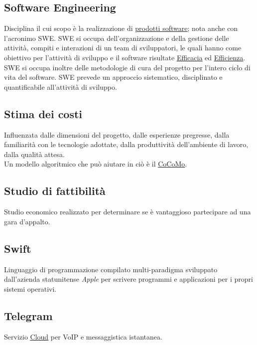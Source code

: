 	\subsection{Software Engineering}
	\label{sec:swe}
	Disciplina il cui scopo è la realizzazione di  \underline{\hyperref[sec:prodottosoftware]{prodotti software}}; nota anche con l'acronimo SWE.
	SWE si occupa dell'organizzazione e della gestione delle attività, compiti e interazioni di un team di sviluppatori,
	le quali hanno come obiettivo per l'attività di sviluppo e il software risultate \underline{\hyperref[sec:efficacia]{Efficacia}} ed \underline{\hyperref[sec:efficienza]{Efficienza}}.
	SWE si occupa inoltre delle metodologie di cura del progetto per l'intero ciclo di vita del software.
	SWE prevede un approccio sistematico, disciplinato e quantificabile all'attività di sviluppo.

	\subsection{Stima dei costi}
	\label{sec:stimacosti}
	Influenzata dalle dimensioni del progetto, dalle esperienze pregresse, dalla familiarità con le tecnologie adottate, dalla produttività dell'ambiente di lavoro, dalla qualità attesa. \\Un modello algoritmico che può aiutare in ciò è il \underline{\hyperref[sec:cocomo]{CoCoMo}}.

	\subsection{Studio di fattibilità}
	\label{sec:studiofattibilita}
	Studio economico realizzato per determinare se è vantaggioso partecipare ad una gara d'appalto.

	\subsection{Swift}
	\label{sec:swift}
	Linguaggio di programmazione compilato multi-paradigma sviluppato dall'azienda statunitense \emph{Apple} per scrivere programmi e applicazioni per i propri sistemi operativi.

	\newpage


	\subsection{Telegram}
	\label{sec:telegram}
	Servizio \underline{\hyperref[sec:cloud]{Cloud}} per VoIP e messaggistica istantanea.

